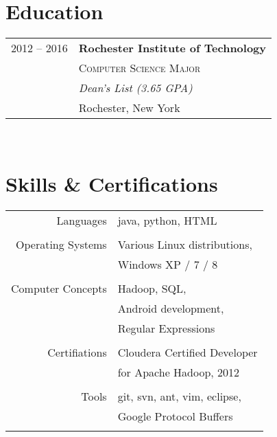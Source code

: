 \documentclass[10pt]{article} %
\begin{document}
{\begin{minipage}[t]{0.44\textwidth}

\section{Education} 

\begin{tabular}{rl} %


2012 -- 2016 & \textbf{Rochester Institute of Technology} \\ 
& \textsc{Computer Science Major} \\ 
& \textit{Dean's List (3.65 GPA)}\\
& Rochester, New York \\
\end{tabular}\\[10pt]


\section{Skills \& Certifications} 

\begin{tabular}{rl}
Languages
& java, python, HTML \\ 
& \\
Operating Systems
& Various Linux distributions, \\
& Windows XP / 7 / 8 \\
& \\
Computer Concepts
& Hadoop, SQL, \\
& Android development, \\
& Regular Expressions \\
& \\
Certifiations
& Cloudera Certified Developer \\
& for Apache Hadoop, 2012 \\
& \\
Tools
& git, svn, ant, vim, eclipse, \\
& Google Protocol Buffers \\
& \\
\end{tabular}


\end{minipage}}
\end{document}
